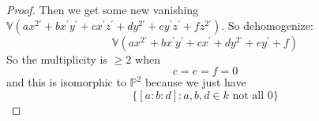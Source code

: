 \documentclass{article}
\begin{document}
\begin{itemize}
\begin{proof}
                Then we get some new vanishing $\mathbb{V}(ax^{2{\prime}} + bx^{\prime}y^{\prime} + cx^{\prime}z^{\prime} + dy^{2\prime} + ey^{\prime}z^{\prime} + fz^{2\prime})$. So dehomogenize:
                \begin{equation*}
                        \mathbb{V}(ax^{2{\prime}} + bx^{\prime}y^{\prime} + cx^{\prime} + dy^{2{\prime}} + ey^{\prime} + f)
                    \end{equation*}
                So the multiplicity is $\geq2$ when 
                    \begin{equation*}
                        c = e = f = 0
                    \end{equation*}
                and this is isomorphic to $\mathbb{P}^{2}$ because we just have 
                    \begin{equation*}
                        \{[a : b : d] : a, b, d \in k \text{ not all $0$}\}
                    \end{equation*}
            \end{proof}


\end{itemize}
\end{document}
